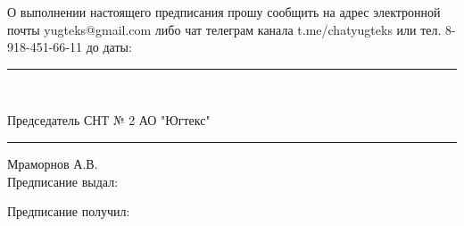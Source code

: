 \vspace{4mm}
О выполнении настоящего предписания прошу сообщить на адрес электронной почты yugteks@gmail.com либо  чат телеграм канала t.me/chatyugteks или тел. 8-918-451-66-11 до  даты: 
\rule{3.5cm}{0.1 mm} \\
\vspace{5mm}

\noindent Председатель СНТ № 2 АО "Югтекс" \hfill    \rule{4cm}{0.1 mm}    Мраморнов А.В.\\[7mm]
\noindent Предписание выдал:  \podpisv{ }{ }

\vspace{5mm}

\noindent Предписание получил: \podpisp{ }{ }
